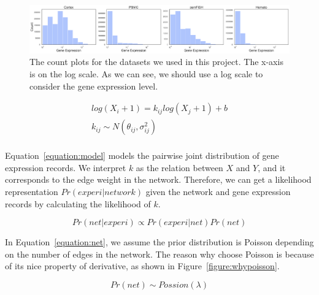 \documentclass{bioinfo}
\begin{document}
\begin{figure}
\centering
  \includegraphics[width=\textwidth]{figure/dist.png}
  \caption{The count plots for the datasets we used in this project. The x-axis is on the log scale. As we can see, we should use a log scale to consider the gene expression level.}
    \label{figure:dist}
\end{figure}


\begin{equation}
    \begin{array}{ll}
            log(X_i+1) = k_{ij} log(X_j+1) +b\\
            k_{ij} \sim N(\theta_{ij}, \sigma_{ij}^2)\\
    \end{array}
    \label{equation:model}
\end{equation}

Equation~\ref{equation:model} models the pairwise joint distribution of gene expression records. We interpret $k$ as the relation between $X$ and $Y$, and it corresponds to the edge weight in the network.  Therefore, we can get a likelihood representation $Pr(experi|network)$ given the network and gene expression records by calculating the likelihood of $k$.

\begin{equation}
    Pr(net|experi) \propto Pr(experi|net) Pr(net)
    \label{equation:bayesian}
\end{equation}


In Equation~\ref{equation:net}, we assume the prior distribution is Poisson depending on the number of edges in the network. The reason why choose Poisson is because of its nice property of derivative, as shown in Figure~\ref{figure:whypoisson}.

\begin{equation}
    Pr(net) \sim Possion(\lambda)
    \label{equation:net}
\end{equation}
\end{document}
